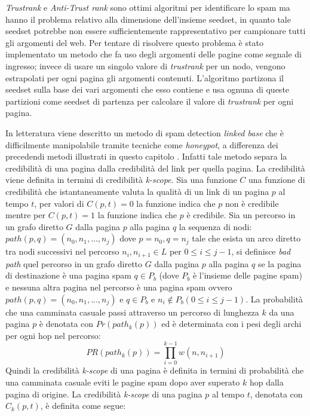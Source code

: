 \textit{Trustrank} e \textit{Anti-Trust rank} sono ottimi algoritmi per identificare lo spam ma hanno il problema relativo alla dimensione dell’insieme  seedset, in quanto tale seedset potrebbe non essere sufficientemente rappresentativo per campionare tutti gli argomenti del web. Per tentare di risolvere questo problema è stato implementato un metodo \cite{Wu:2006:TTU:1135777.1135792}  che fa uso degli argomenti delle pagine come segnale di ingresso;  invece di usare un singolo valore di \textit{trustrank} per un nodo, vengono estrapolati per ogni pagina gli argomenti contenuti. L'algoritmo partizona il seedset sulla base dei vari argomenti che esso contiene e usa ognuna di queste partizioni come seedset di partenza per calcolare il valore di \textit{trustrank} per ogni pagina.

 In letteratura viene descritto un metodo di spam detection  \cite{Caverlee:2007:CWS:1281100.1281124} \textit{linked base} che è difficilmente manipolabile tramite tecniche come \textit{honeypot}, a differenza dei precedendi metodi illustrati in questo capitolo . Infatti tale metodo separa la credibilità di una pagina dalla credibilità del link per quella pagina. La credibilità viene definita in termini di credibilità \textit{k-scope}. Sia una funzione \(C\) una funzione di credibilità che istantaneamente valuta la qualità di un link di un pagina \(p\) al tempo \(t\), per valori di \(C(p,t)=0\) la funzione indica che \(p\) non è credibile mentre per  \(C(p,t)=1\) la funzione indica che \(p\) è credibile. Sia un percorso in un grafo diretto \(G\) dalla pagina \(p\) alla pagina \(q\) la sequenza di nodi: \(path(p,q)=(n_0,n_1,...,n_j)\) dove \(p=n_0, q=n_j\) tale che esista un arco diretto tra nodi successivi nel percorso \(n_i,n_{i+1}\in L\) per \(0\leq i \leq j-1\), si definisce \textit{bad path} quel percorso  in un grafo  diretto \(G\)  dalla pagina \(p\) alla pagina \(q\) se la pagina di destinazione è una pagina spam \(q\in P_b\) (dove \(P_b\) è l'insieme delle pagine spam) e nessuna altra pagina nel percorso è una pagina spam ovvero \(path(p,q)=(n_0,n_1,...,n_j)\) e \(q\in P_b\) e \(n_i\not\in P_b (0\leq i\leq j-1)\). La probabilità che una camminata casuale passi attraverso un percorso di lunghezza \(k\) da una pagina \(p\) è denotata con \(Pr(path_k(p))\) ed è determinata con i pesi degli archi per ogni hop nel percorso:
\begin{equation}
 PR(path_k(p))=\prod_{i=0}^{k-1}w(n,n_{i+1})
\end{equation}
Quindi la credibilità \textit{k-scope} di una pagina  è definita in termini di probabilità che una camminata casuale eviti le pagine spam dopo aver superato \(k\) hop dalla pagina di origine. La credibilità \textit{k-scope} di una pagina \(p\) al tempo \(t\), denotata con \(C_k(p,t)\), è definita come segue:

